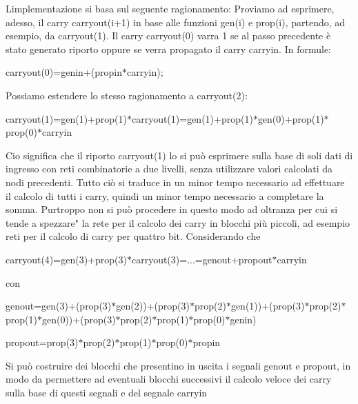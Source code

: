 \begin{DoxyCompactList}
{L\textquotesingle{}implementazione si basa sul seguente ragionamento\+: Proviamo ad esprimere, adesso, il carry carryout(i+1) in base alle funzioni gen(i) e prop(i), partendo, ad esempio, da carryout(1). Il carry carryout(0) varra\textquotesingle{} 1 se al passo precedente è stato generato riporto oppure se verra\textquotesingle{} propagato il carry carryin. In formule\+: \begin{center}carryout(0)=genin+(propin$\ast$carryin);\end{center}  Possiamo estendere lo stesso ragionamento a carryout(2)\+: \begin{center}carryout(1)=gen(1)+prop(1)$\ast$carryout(1)=gen(1)+prop(1)$\ast$gen(0)+prop(1)$\ast$prop(0)$\ast$carryin\end{center}  Cio\textquotesingle{} significa che il riporto carryout(1) lo si può esprimere sulla base di soli dati di ingresso con reti combinatorie a due livelli, senza utilizzare valori calcolati da nodi precedenti. Tutto ciò si traduce in un minor tempo necessario ad effettuare il calcolo di tutti i carry, quindi un minor tempo necessario a completare la somma. Purtroppo non si può procedere in questo modo ad oltranza per cui si tende a spezzare" la rete per il calcolo dei carry in blocchi più piccoli, ad esempio reti per il calcolo di carry per quattro bit. Considerando che \begin{center}carryout(4)=gen(3)+prop(3)$\ast$carryout(3)=...=genout+propout$\ast$carryin\end{center}  con \begin{center}genout=gen(3)+(prop(3)$\ast$gen(2))+(prop(3)$\ast$prop(2)$\ast$gen(1))+(prop(3)$\ast$prop(2)$\ast$prop(1)$\ast$gen(0))+(prop(3)$\ast$prop(2)$\ast$prop(1)$\ast$prop(0)$\ast$genin)\end{center}  \begin{center}propout=prop(3)$\ast$prop(2)$\ast$prop(1)$\ast$prop(0)$\ast$propin\end{center}  Si può costruire dei blocchi che presentino in uscita i segnali genout e propout, in modo da permettere ad eventuali blocchi successivi il calcolo veloce dei carry sulla base di questi segnali e del segnale carryin }{\pageref{classcla__carry__net_1_1dataflow}}{}
\item{}
\end{DoxyCompactList}
